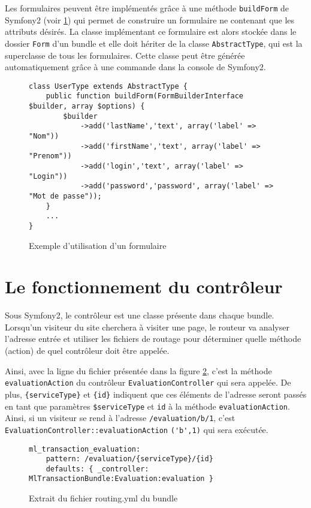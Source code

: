 Les formulaires peuvent être implémentés grâce à une méthode \verb|buildForm| de Symfony2 (voir \ref{fig:form}) qui permet de construire un formulaire ne contenant que les attributs désirés. La classe implémentant ce formulaire est alors stockée dans le dossier \verb|Form| d'un bundle et elle doit hériter de la classe \verb|AbstractType|, qui est la superclasse de tous les formulaires.
Cette classe peut être générée automatiquement grâce à une commande dans la console de Symfony2.

\begin{figure}[h]
\centering
\begin{lstlisting}
class UserType extends AbstractType {
    public function buildForm(FormBuilderInterface $builder, array $options) {
        $builder
            ->add('lastName','text', array('label' => "Nom"))
            ->add('firstName','text', array('label' => "Prenom"))
            ->add('login','text', array('label' => "Login"))
            ->add('password','password', array('label' => "Mot de passe"));
    }
    ...
}
\end{lstlisting}
\caption{Exemple d'utilisation d'un formulaire}
\label{fig:form}
\end{figure}

\section{Le fonctionnement du contrôleur}

Sous Symfony2, le contrôleur est une classe présente dans chaque bundle. Lorsqu'un visiteur du site cherchera à visiter une page, le routeur va analyser l'adresse entrée et utiliser les fichiers de routage pour déterminer quelle méthode (action) de quel contrôleur doit être appelée.

Ainsi, avec la ligne du fichier présentée dans la figure \ref{fig:routing_exemple}, c'est la méthode \verb|evaluationAction| du contrôleur \verb|EvaluationController| qui sera appelée. De plus, \verb|{serviceType}| et \verb|{id}| indiquent que ces éléments de l'adresse seront passés en tant que paramètres \verb|$serviceType| et \verb|id| à la méthode \verb|evaluationAction|. Ainsi, si un visiteur se rend à l'adresse \verb|/evaluation/b/1|, c'est \verb|EvaluationController::evaluationAction| \verb|('b',1)| qui sera exécutée.

\begin{figure}[h]
\centering
\begin{lstlisting}
ml_transaction_evaluation:
    pattern: /evaluation/{serviceType}/{id}
    defaults: { _controller: MlTransactionBundle:Evaluation:evaluation }
\end{lstlisting}
\caption{Extrait du fichier routing.yml du bundle}
\label{fig:routing_exemple}
\end{figure}

